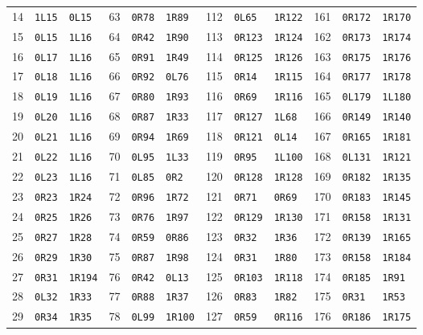 \begin{center}
\begin{tabular}{@{}rll@{\quad}rll@{\quad}rll@{\quad}rll@{}}
14&\texttt{1L15}&\texttt{0L15}&63&\texttt{0R78}&\texttt{1R89}&112&\texttt{0L65}&\texttt{1R122}&161&\texttt{0R172}&\texttt{1R170}\\
15&\texttt{0L15}&\texttt{1L16}&64&\texttt{0R42}&\texttt{1R90}&113&\texttt{0R123}&\texttt{1R124}&162&\texttt{0R173}&\texttt{1R174}\\
16&\texttt{0L17}&\texttt{1L16}&65&\texttt{0R91}&\texttt{1R49}&114&\texttt{0R125}&\texttt{1R126}&163&\texttt{0R175}&\texttt{1R176}\\
17&\texttt{0L18}&\texttt{1L16}&66&\texttt{0R92}&\texttt{0L76}&115&\texttt{0R14}&\texttt{1R115}&164&\texttt{0R177}&\texttt{1R178}\\
18&\texttt{0L19}&\texttt{1L16}&67&\texttt{0R80}&\texttt{1R93}&116&\texttt{0R69}&\texttt{1R116}&165&\texttt{0L179}&\texttt{1L180}\\
19&\texttt{0L20}&\texttt{1L16}&68&\texttt{0R87}&\texttt{1R33}&117&\texttt{0R127}&\texttt{1L68}&166&\texttt{0R149}&\texttt{1R140}\\
20&\texttt{0L21}&\texttt{1L16}&69&\texttt{0R94}&\texttt{1R69}&118&\texttt{0R121}&\texttt{0L14}&167&\texttt{0R165}&\texttt{1R181}\\
21&\texttt{0L22}&\texttt{1L16}&70&\texttt{0L95}&\texttt{1L33}&119&\texttt{0R95}&\texttt{1L100}&168&\texttt{0L131}&\texttt{1R121}\\
22&\texttt{0L23}&\texttt{1L16}&71&\texttt{0L85}&\texttt{0R2}&120&\texttt{0R128}&\texttt{1R128}&169&\texttt{0R182}&\texttt{1R135}\\
23&\texttt{0R23}&\texttt{1R24}&72&\texttt{0R96}&\texttt{1R72}&121&\texttt{0R71}&\texttt{0R69}&170&\texttt{0R183}&\texttt{1R145}\\
24&\texttt{0R25}&\texttt{1R26}&73&\texttt{0R76}&\texttt{1R97}&122&\texttt{0R129}&\texttt{1R130}&171&\texttt{0R158}&\texttt{1R131}\\
25&\texttt{0R27}&\texttt{1R28}&74&\texttt{0R59}&\texttt{0R86}&123&\texttt{0R32}&\texttt{1R36}&172&\texttt{0R139}&\texttt{1R165}\\
26&\texttt{0R29}&\texttt{1R30}&75&\texttt{0R87}&\texttt{1R98}&124&\texttt{0R31}&\texttt{1R80}&173&\texttt{0R158}&\texttt{1R184}\\
27&\texttt{0R31}&\texttt{1R194}&76&\texttt{0R42}&\texttt{0L13}&125&\texttt{0R103}&\texttt{1R118}&174&\texttt{0R185}&\texttt{1R91}\\
28&\texttt{0L32}&\texttt{1R33}&77&\texttt{0R88}&\texttt{1R37}&126&\texttt{0R83}&\texttt{1R82}&175&\texttt{0R31}&\texttt{1R53}\\
29&\texttt{0R34}&\texttt{1R35}&78&\texttt{0L99}&\texttt{1R100}&127&\texttt{0R59}&\texttt{0R116}&176&\texttt{0R186}&\texttt{1R175}\\

\end{tabular}
\end{center}
